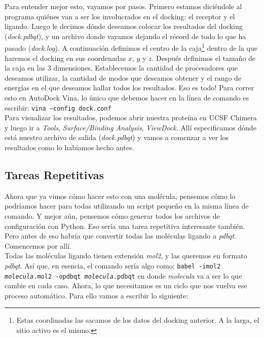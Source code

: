 \documentclass[10pt,letterpaper]{article}
\newcommand{\inlinecode}[1]{
\colorbox{light-gray}{\texttt{#1}}
}
\begin{document}
Para entender mejor esto, vayamos por pasos. Primero estamos dici\'endole al programa qui\'enes van a ser los involucrados en el docking: el receptor y el ligando. Luego le decimos d\'onde deseamos colocar los resultados del docking (\emph{dock.pdbqt}), y un archivo donde vayamos dejando el r\'ecord de todo lo que ha pasado (\emph{dock.log}). A continuaci\'on definimos el centro de la caja\footnote{Estas coordinadas las sacamos de los datos del docking anterior. A la larga, el sitio activo es el mismo.} dentro de la que haremos el docking en sus coordenadas $x$, $y$ y $z$. Despu\'es definimos el tama\~no de la caja en las 3 dimensiones. Establecemos la cantidad de procesadores que deseamos utilizar, la cantidad de modos que deseamos obtener y el rango de energ\'ias en el que deseamos hallar todos los resultados. Eso es todo! Para correr esto en AutoDock Vina, lo \'unico que debemos hacer en la l\'inea de comando es escribir: \inlinecode{vina --config dock.conf}\\

Para visualizar los resultados, podemos abrir nuestra prote\'ina en UCSF Chimera y luego ir a \emph{Tools}, \emph{Surface/Binding Analysis}, \emph{ViewDock}. All\'i especificamos d\'onde est\'a nuestro archivo de salida (\emph{dock.pdbqt}) y vamos a comenzar a ver los resultados como lo hab\'iamos hecho antes.\\

\subsection{Tareas Repetitivas}

Ahora que ya vimos c\'omo hacer esto con una mol\'ecula, pensemos c\'omo lo podr\'iamos hacer para todas utilizando un script peque\~no en la misma l\'inea de comando. Y mejor a\'un, pensemos c\'omo generar todos los archivos de configuraci\'on con Python. Eso ser\'ia una tarea repetitiva interesante tambi\'en. Pero antes de eso habr\'ia que convertir todas las mol\'eculas ligando a \emph{pdbqt}. Comencemos por all\'i.\\

Todas las mol\'eculas ligando tienen extensi\'on \emph{mol2}, y las queremos en formato \emph{pdbqt}. As\'i que, en esencia, el comando ser\'ia algo como: \inlinecode{babel -imol2 \emph{molecula}.mol2 -opdbqt \emph{molecula}.pdbqt} en donde \emph{molecula} va a ser lo que cambie en cada caso. Ahora, lo que necesitamos es un ciclo que nos vuelva ese proceso autom\'atico. Para ello vamos a escribir lo siguiente:
\end{document}
